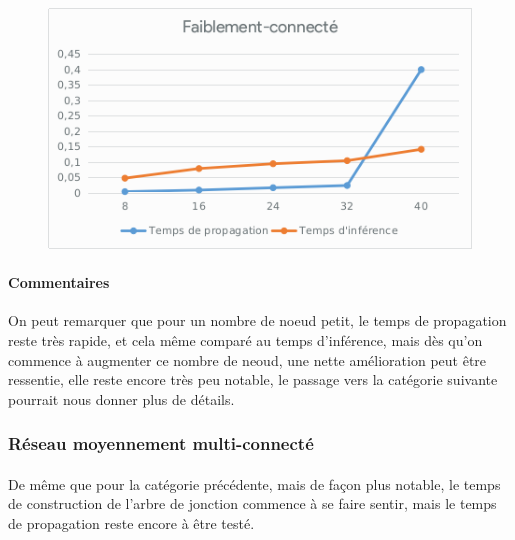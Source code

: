 \documentclass[]{report}
\begin{document}
	\begin{figure}[H]
		\centering
		\includegraphics[width=0.75\linewidth]{sheets/weakly.png}
	\end{figure}

	\paragraph{Commentaires}
	On peut remarquer que pour un nombre de noeud petit, le temps de propagation reste très rapide, et cela même comparé au
	temps d'inférence, mais dès qu'on commence à augmenter ce nombre de neoud, une nette amélioration peut être ressentie, elle
	reste encore très peu notable, le passage vers la catégorie suivante pourrait nous donner plus de détails.


	\subsubsection{Réseau moyennement multi-connecté}
	\paragraph{}
	De même que pour la catégorie précédente, mais de façon plus notable, le temps de construction de l'arbre de jonction commence
	à se faire sentir, mais le temps de propagation reste encore à être testé.

	\begin{table}[H]
	\centering
	\end{table}
\end{document}

